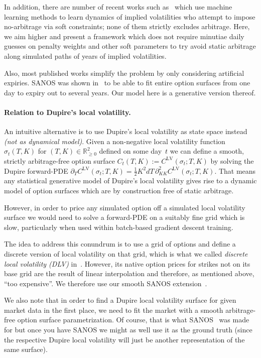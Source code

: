 \documentclass[11pt,a4paper]{article}
\newcommand{\R}{\mathbb{R}}
\begin{document}
In addition, there are number
of recent works such as~\cite{vae_ning2023arbitrage} which use machine learning methods to learn
dynamics of implied volatilities who attempt to impose no-arbitrage
via soft constraints; none of them strictly excludes arbitrage. Here, we
aim higher and present a framework which does not require 
minutiae daily guesses on penalty weights and other soft parameters 
to try avoid static arbitrage along simulated paths of years
of implied volatilities.



Also, most published works simplify the problem by only considering artificial expiries.
SANOS was shown in~\cite{SANOS2026} to be able to fit entire option surfaces
from one day to expiry out to several years. Our model here is a generative version thereof.

\paragraph{Relation to Dupire's local volatility.}
An intuitive alternative is to use Dupire's local volatility as state space instead 
\emph{(not as dynamical model)}. Given a non-negative local volatility function
$\sigma_t(T,K)$ for $(T,K)\in\R^2_{\geq 0}$ defined on some day~$t$
we can define 
a smooth, strictly arbitrage-free option surface 
$C_t(T,K):=C^\mathrm{LV}(\sigma_t;T,K)$ 
by solving the Dupire forward-PDE $\partial_T C^\mathrm{LV}(\sigma_t;T,K) = \mbox{$\frac12$} K^2 dT\, \partial^2_{KK} C^\mathrm{LV}(\sigma_t;T,K)$.
That means any statistical generative model of Dupire's local volatility gives rise
to a dynamic model of option surfaces which are by construction free of static arbitrage.

However, in order to price any simulated option off a simulated local volatility surface
we would need to solve a forward-PDE on a suitably
fine grid which is slow, particularly when used within batch-based gradient descent training.

The idea to address this conundrum is to use a grid of options and define a discrete version
of local volatility on that grid, which is what we called
\emph{discrete local volatility (DLV)} in~\cite{DLV}. However,
its native option prices for strikes not on its base grid are the result of linear interpolation and therefore, as mentioned above, ``too expensive''.
We therefore use
our smooth SANOS extension~\cite{SANOS2026}.

We also note that in order to find a Dupire local volatility surface for
given market data in the first place, we 
need to fit the market with a smooth arbitrage-free option surface parametrization.
Of course, that is what SANOS~\cite{SANOS2026} was made for but once you have SANOS
we might as well use it as the ground truth (since the respective Dupire local volatility
will just be another representation of the same surface).
\end{document}
